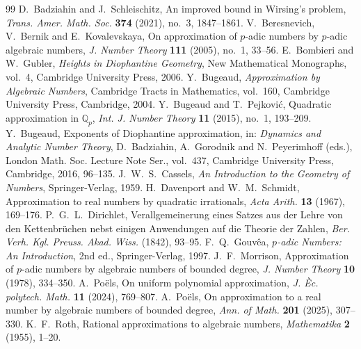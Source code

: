 \documentclass[10pt,a4paper]{amsart}
\newcommand{\Qp}{\mathbb Q_p}
\begin{document}
\begin{thebibliography}{99}
 D.~Badziahin and J.~Schleischitz, An improved bound in Wirsing's problem, \emph{Trans. Amer. Math. Soc.} \textbf{374} (2021), no.~3, 1847--1861.
 V.~Beresnevich, V.~Bernik and E.~Kovalevskaya, On approximation of $p$-adic numbers by $p$-adic algebraic numbers, \emph{J. Number Theory} \textbf{111} (2005), no.~1, 33--56.
 E.~Bombieri and W.~Gubler, \emph{Heights in Diophantine Geometry}, New Mathematical Monographs, vol.~4, Cambridge University Press, 2006.
 Y.~Bugeaud, \emph{Approximation by Algebraic Numbers}, Cambridge Tracts in Mathematics, vol.~160, Cambridge University Press, Cambridge, 2004.
 Y.~Bugeaud and T.~Pejkovi\'c, Quadratic approximation in $\Qp$, \emph{Int. J. Number Theory} \textbf{11} (2015), no.~1, 193--209.
 Y.~Bugeaud, Exponents of Diophantine approximation, in: \emph{Dynamics and Analytic Number Theory}, D.~Badziahin, A.~Gorodnik and N.~Peyerimhoff (eds.), London Math. Soc. Lecture Note Ser., vol.~437, Cambridge University Press, Cambridge, 2016, 96--135.
 J.~W.~S.~Cassels, \emph{An Introduction to the Geometry of Numbers}, Springer-Verlag, 1959.
 H.~Davenport and W.~M.~Schmidt, Approximation to real numbers by quadratic irrationals, \emph{Acta Arith.} \textbf{13} (1967), 169--176.
 P.~G.~L.~Dirichlet, Verallgemeinerung eines Satzes aus der Lehre von den Kettenbr\"uchen nebst einigen Anwendungen auf die Theorie der Zahlen, \emph{Ber. Verh. Kgl. Preuss. Akad. Wiss.} (1842), 93--95.
 F.~Q.~Gouv\^ea, \emph{$p$-adic Numbers: An Introduction}, 2nd ed., Springer-Verlag, 1997.
 J.~F.~Morrison, Approximation of $p$-adic numbers by algebraic numbers of bounded degree, \emph{J. Number Theory} \textbf{10} (1978), 334--350.
 A.~Po\"els, On uniform polynomial approximation, \emph{J. \`Ec. polytech. Math.} \textbf{11} (2024), 769--807.
 A.~Po\"els, On approximation to a real number by algebraic numbers of bounded degree, \emph{Ann. of Math.} \textbf{201} (2025), 307--330.
 K.~F.~Roth, Rational approximations to algebraic numbers, \emph{Mathematika} \textbf{2} (1955), 1--20.

\end{thebibliography}
\end{document}
